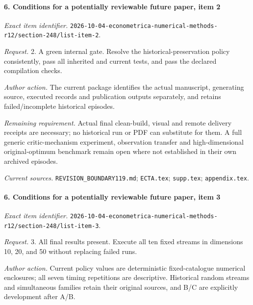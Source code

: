 \paragraph{6. Conditions for a potentially reviewable future paper, item 2}

\emph{Exact item identifier.} \nolinkurl{2026-10-04-econometrica-numerical-methods-r12/section-248/list-item-2}.

\par\emph{Request.} 2. A green internal gate. Resolve the historical-preservation policy consistently, pass all inherited and current tests, and pass the declared compilation checks.

\par\emph{Author action.} The current package identifies the actual manuscript, generating source, executed records and publication outputs separately, and retains failed/\allowbreak{}incomplete historical episodes.

\par\emph{Remaining requirement.} Actual final clean-build, visual and remote delivery receipts are necessary; no historical run or PDF can substitute for them. A full generic critic-mechanism experiment, observation transfer and high-dimensional original-optimum benchmark remain open where not established in their own archived episodes.

\par\emph{Current sources.} \nolinkurl{REVISION_BOUNDARY119.md}; \nolinkurl{ECTA.tex}; \nolinkurl{supp.tex}; \nolinkurl{appendix.tex}.

\paragraph{6. Conditions for a potentially reviewable future paper, item 3}

\emph{Exact item identifier.} \nolinkurl{2026-10-04-econometrica-numerical-methods-r12/section-248/list-item-3}.

\par\emph{Request.} 3. All final results present. Execute all ten fixed streams in dimensions 10, 20, and 50 without replacing failed runs.

\par\emph{Author action.} Current policy values are deterministic fixed-catalogue numerical enclosures; all seven timing repetitions are descriptive. Historical random streams and simultaneous families retain their original sources, and B/\allowbreak{}C are explicitly development after A/\allowbreak{}B.

